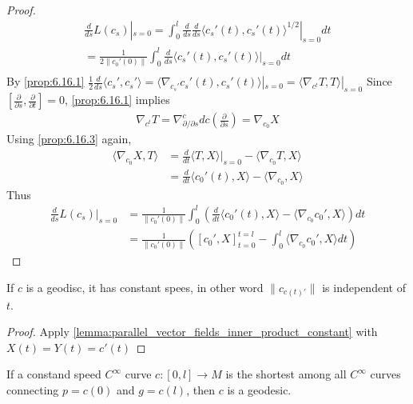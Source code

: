 \begin{proof}
    \[
    \begin{aligned}
        \frac{d}{ds} L(c_s) |_{s=0} = \int_0^l \frac{d}{ds} \frac{d}{ds} \langle c_s'(t),c_s'(t) \rangle^{1/2}|_{s=0} dt \\
        = \frac{1}{2 \|c_0'(0)\|} \int_0^l \frac{d}{ds} \langle c_s'(t), c_s'(t) \rangle |_{s=0} dt \\
    \end{aligned}
    \]
    By \autoref{prop:6.16.1} $\frac{1}{2} \frac{d}{ds} \langle c_s', c_s' \rangle = \langle \nabla_{c_s'} c_s'(t), c_s'(t) \rangle|_{s=0} = \langle \nabla_{c^t}T, T \rangle |_{s=0}$
    Since $[\frac{\partial}{\partial s}, \frac{\partial}{\partial t}] = 0$, \autoref{prop:6.16.1} implies
    \[
    \begin{aligned}
        \nabla_{c^t}T = \nabla^c_{\partial / \partial s} dc (\frac{\partial}{\partial s}) = \nabla_{c_0}X
    \end{aligned}
    \]
    Using \autoref{prop:6.16.3} again,
    \[
    \begin{aligned}
        \langle \nabla_{c_0} X, T \rangle &= \frac{d}{dt} \langle T, X \rangle |_{s=0} - \langle \nabla_{c_0}T, X \rangle \\
        &= \frac{d}{dt} \langle c_0'(t), X \rangle - \langle \nabla_{c_0}, X \rangle
    \end{aligned}
    \]
    Thus
    \[
    \begin{aligned}
        \frac{d}{ds} L(c_s)|_{s=0} &= \frac{1}{\|c_0'(0)\|} \int_0^l \left( \frac{d}{dt} \langle c_0'(t),X \rangle - \langle \nabla_{c_0}c_0', X \rangle\right)dt \\
        &= \frac{1}{\|c_0'(0)\|} \left( [c_0', X]_{t=0}^{t=l} - \int_0^l \langle \nabla_{c_0}c_0', X \rangle dt\right)
    \end{aligned}
    \]
\end{proof}

\begin{proposition}
    If $c$ is a geodisc, it has constant spees, in other word $\|c_{c(t)'}\|$ is independent of $t$.
\end{proposition}

\begin{proof}
    Apply \autoref{lemma:parallel_vector_fields_inner_product_constant} with $X(t) = Y(t) = c'(t)$
\end{proof}

\begin{theorem}
    If a constand speed $C^{\infty}$ curve $c : [0,l] \to M$
    is the shortest among all $C^{\infty}$ curves connecting $p = c(0)$
    and $g = c(l)$, then $c$ is a geodesic.
    \label{thm:7.5}
\end{theorem}

